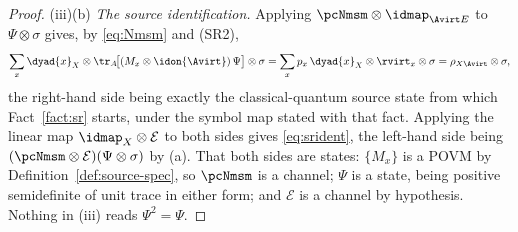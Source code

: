 \begin{proof}
(iii)(b) \emph{The source identification.} Applying
$\pcNmsm\otimes\idmap_{\Avirt E}$ to $\Psi\otimes\sigma$ gives, by
\eqref{eq:Nmsm} and (SR2),
\begin{equation*}
  \sum_x\dyad{x}_X\otimes
  \tr_A\!\big[(M_x\otimes\idon{\Avirt})\,\Psi\big]\otimes\sigma
  =\sum_xp_x\,\dyad{x}_X\otimes\rvirt_x\otimes\sigma
  =\rho_{X\Avirt}\otimes\sigma ,
\end{equation*}
the right-hand side being exactly the classical-quantum source state from
which Fact~\ref{fact:sr} starts, under the symbol map stated with that
fact. Applying the linear map $\idmap_X\otimes\mathcal{E}$ to both
sides gives \eqref{eq:srident}, the left-hand side being
$(\pcNmsm\otimes\mathcal{E})(\Psi\otimes\sigma)$ by (a). That both sides
are states: $\{M_x\}$ is a POVM by Definition~\ref{def:source-spec}, so
$\pcNmsm$ is a channel; $\Psi$ is a state, being positive semidefinite of
unit trace in either form; and $\mathcal{E}$ is a channel by hypothesis.
Nothing in (iii) reads $\Psi^2=\Psi$.
\end{proof}
